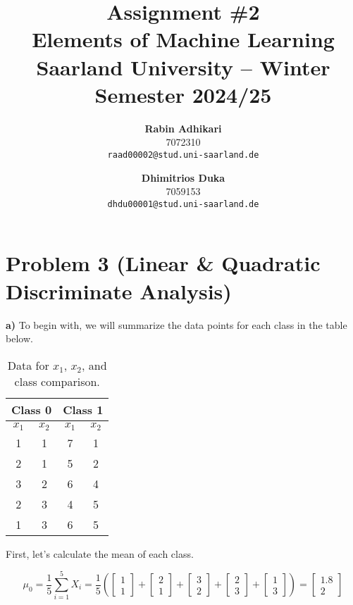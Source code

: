 \documentclass{article}
\title{Assignment \#2\\
  \vspace{2mm}
  \small{Elements of Machine Learning}
  \\
  \vspace{2mm}
  \small{Saarland University -- Winter Semester 2024/25}
}
\author{%
\textbf{Rabin Adhikari} \\
  7072310 \\
  \texttt{raad00002@stud.uni-saarland.de} \\
  \and
  \textbf{Dhimitrios Duka} \\
 7059153 \\
  \texttt{dhdu00001@stud.uni-saarland.de} \\
}
\begin{document}
\maketitle

\section*{Problem 3 (Linear \& Quadratic Discriminate Analysis)}
\textbf{a)} To begin with, we will summarize the data points for each class in the table below.

\begin{table}[h!]
  \centering
  \caption{
    Data for \(x_1\), \(x_2\), and class comparison.
  }
  \begin{tabular}{cc|cc}
    \toprule
    \multicolumn{2}{c}{\textbf{Class 0}} & \multicolumn{2}{c}{\textbf{Class 1}} \\
    \midrule
    \(x_1\) & \(x_2\) & \(x_1\) & \(x_2\) \\
    1 & 1 & 7 & 1 \\
    2 & 1 & 5 & 2 \\
    3 & 2 & 6 & 4 \\
    2 & 3 & 4 & 5 \\
    1 & 3 & 6 & 5 \\
    \bottomrule
  \end{tabular}
  \label{tab:x1_x2_classes_side_by_side}
\end{table}

First, let's calculate the mean of each class.

\begin{equation}
  \mu_0 = \frac{1}{5} \sum_{i=1}^{5} X_i = \frac{1}{5} \left( \begin{bmatrix} 1 \\ 1 \end{bmatrix} + \begin{bmatrix} 2 \\ 1 \end{bmatrix} + \begin{bmatrix} 3 \\ 2 \end{bmatrix} + \begin{bmatrix} 2 \\ 3 \end{bmatrix} + \begin{bmatrix} 1 \\ 3 \end{bmatrix} \right) = \begin{bmatrix} 1.8 \\ 2 \end{bmatrix}
\end{equation}
\end{document}
